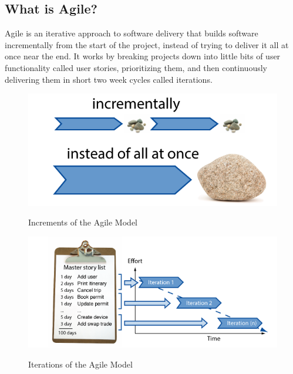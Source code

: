 \subsection{What is Agile?}
Agile is an iterative approach to software delivery that builds software incrementally from the start of the project, instead of trying to deliver it all at once near the end. It works by breaking projects down into little bits of user functionality called user stories, prioritizing them, and then continuously delivering them in short two week cycles called iterations.

\begin{figure}[htbp]
\center \includegraphics[width=400pt]{figures/incrementally-over-all-at-once}\\
\caption{Increments of the Agile Model \citep{AIAN-16}} \label{Figure: Increments of the Agile Model}
\label{fig:agile}
\end{figure}

\begin{figure}[htbp]
\center \includegraphics[width=400pt]{figures/burn-down-simple}\\
\caption{Iterations of the Agile Model \citep{AIAN-16}} \label{Figure: Iterations of the Agile Model}
\label{fig:agile}
\end{figure}

